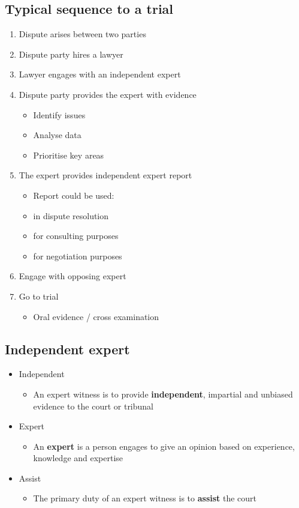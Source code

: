 \subsection{Typical sequence to a trial}
\begin{enumerate}
    \item Dispute arises between two parties
    \item Dispute party hires a lawyer
    \item Lawyer engages with an independent expert
    \item Dispute party provides the expert with evidence
          \begin{itemize}
              \item Identify issues
              \item Analyse data
              \item Prioritise key areas
          \end{itemize}
    \item The expert provides independent expert report
          \begin{itemize}
              \item Report could be used:
              \item in dispute resolution
              \item for consulting purposes
              \item for negotiation purposes
          \end{itemize}
    \item Engage with opposing expert
    \item Go to trial
          \begin{itemize}
              \item Oral evidence / cross examination
          \end{itemize}
\end{enumerate}
\subsection{Independent expert}
\begin{itemize}
    \item Independent
          \begin{itemize}
              \item An expert witness is to provide \textbf{independent}, impartial and unbiased evidence to the court or tribunal
          \end{itemize}
    \item Expert
          \begin{itemize}
              \item An \textbf{expert} is a person engages to give an opinion based on experience, knowledge and expertise
          \end{itemize}
    \item Assist
          \begin{itemize}
              \item The primary duty of an expert witness is to \textbf{assist} the court
          \end{itemize}
\end{itemize}
